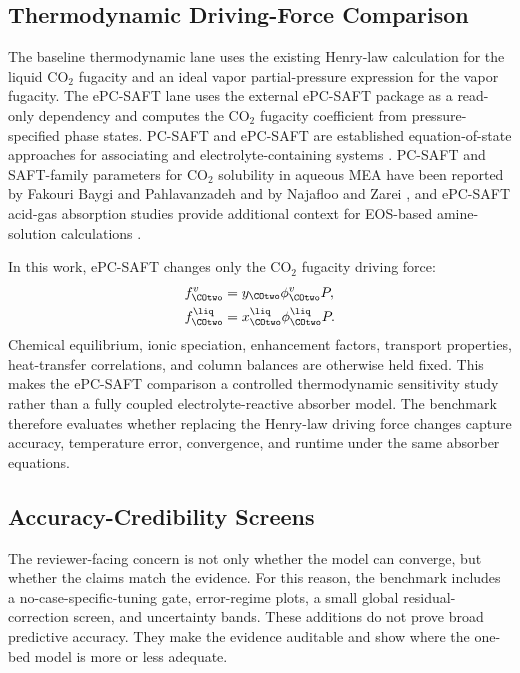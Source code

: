     \subsection{Thermodynamic Driving-Force Comparison}
        The baseline thermodynamic lane uses the existing Henry-law calculation for the liquid CO$_2$ fugacity and an ideal vapor partial-pressure expression for the vapor fugacity. The ePC-SAFT lane uses the external ePC-SAFT package as a read-only dependency and computes the CO$_2$ fugacity coefficient from pressure-specified phase states. PC-SAFT and ePC-SAFT are established equation-of-state approaches for associating and electrolyte-containing systems \cite{Gross2001PC-SAFT:Molecules,Cameretti2005ModelingOriginal}. PC-SAFT and SAFT-family parameters for CO$_2$ solubility in aqueous MEA have been reported by Fakouri Baygi and Pahlavanzadeh and by Najafloo and Zarei \cite{FakouriBaygi2015ApplicationSolutions,Najafloo2018}, and ePC-SAFT acid-gas absorption studies provide additional context for EOS-based amine-solution calculations \cite{Cleeton2020CompetitiveEPC-SAFT,Bulow2021PredictingEPC-SAFT}.

        In this work, ePC-SAFT changes only the CO$_2$ fugacity driving force:
        \begin{align}
            f_{\COtwo}^{v} &= y_{\COtwo}\phi_{\COtwo}^{v}P,\\
            f_{\COtwo}^{\liq} &= x_{\COtwo}^{\liq}\phi_{\COtwo}^{\liq}P.
        \end{align}
        Chemical equilibrium, ionic speciation, enhancement factors, transport properties, heat-transfer correlations, and column balances are otherwise held fixed. This makes the ePC-SAFT comparison a controlled thermodynamic sensitivity study rather than a fully coupled electrolyte-reactive absorber model. The benchmark therefore evaluates whether replacing the Henry-law driving force changes capture accuracy, temperature error, convergence, and runtime under the same absorber equations.

    \subsection{Accuracy-Credibility Screens}
        The reviewer-facing concern is not only whether the model can converge, but whether the claims match the evidence. For this reason, the benchmark includes a no-case-specific-tuning gate, error-regime plots, a small global residual-correction screen, and uncertainty bands. These additions do not prove broad predictive accuracy. They make the evidence auditable and show where the one-bed model is more or less adequate.

